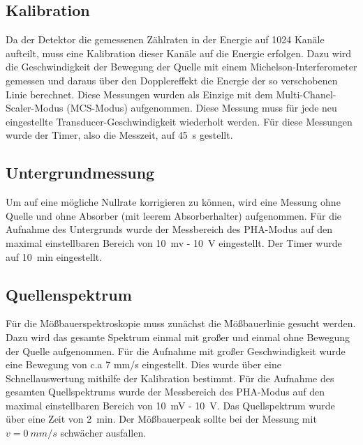 \documentclass[12pt,a4paper]{article}
\begin{document}
\subsection{Kalibration}
Da der Detektor die gemessenen Zählraten in der Energie auf 1024 Kanäle aufteilt, muss eine Kalibration dieser Kanäle auf die Energie erfolgen. Dazu wird die Geschwindigkeit der Bewegung der Quelle mit einem Michelson-Interferometer gemessen und daraus über den Dopplereffekt die Energie der so verschobenen Linie berechnet. Diese Messungen wurden als Einzige mit dem Multi-Chanel-Scaler-Modus (MCS-Modus) aufgenommen. Diese Messung muss für jede neu eingestellte Transducer-Geschwindigkeit wiederholt werden. Für diese Messungen wurde der Timer, also die Messzeit, auf \SI{45}{s} gestellt.

\subsection{Untergrundmessung}
Um auf eine mögliche Nullrate korrigieren zu können, wird eine Messung ohne Quelle und ohne Absorber (mit leerem Absorberhalter) aufgenommen. Für die Aufnahme des Untergrunds wurde der Messbereich des PHA-Modus auf den maximal einstellbaren Bereich von \SI{10}{mv} - \SI{10}{V} eingestellt. Der Timer wurde auf \SI{10}{min} eingestellt.

\subsection{Quellenspektrum}
Für die Mößbauerspektroskopie muss zunächst die Mößbauerlinie gesucht werden. Dazu wird das gesamte Spektrum einmal mit großer und einmal ohne Bewegung der Quelle aufgenommen. Für die Aufnahme mit großer Geschwindigkeit wurde eine Bewegung von c.a 7 mm/s eingestellt. Dies wurde über eine Schnellauswertung mithilfe der Kalibration bestimmt. Für die Aufnahme des gesamten Quellspektrums wurde der Messbereich des PHA-Modus auf den maximal einstellbaren Bereich von \SI{10}{mV} - \SI{10}{V}. Das Quellspektrum wurde über eine Zeit von \SI{2}{min}. Der Mößbauerpeak sollte bei der Messung mit $v = \SI{0}{mm/s}$ schwächer ausfallen.
\end{document}
